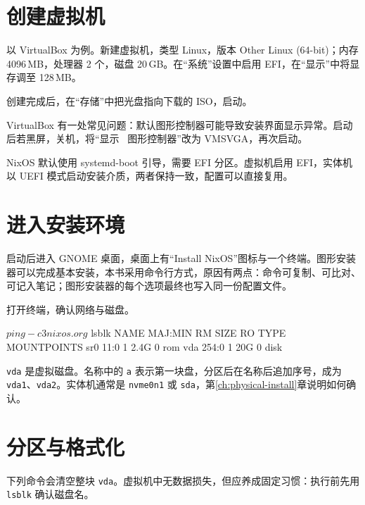 \section{创建虚拟机}

以 VirtualBox 为例。新建虚拟机，类型 Linux，版本 Other Linux (64-bit)；内存 4096\,MB，处理器 2 个，磁盘 20\,GB。在“系统”设置中启用 EFI，在“显示”中将显存调至 128\,MB。

创建完成后，在“存储”中把光盘指向下载的 ISO，启动。

VirtualBox 有一处常见问题：默认图形控制器可能导致安装界面显示异常。启动后若黑屏，关机，将“显示 \textrightarrow\ 图形控制器”改为 VMSVGA，再次启动。

\begin{notebox}
NixOS 默认使用 systemd-boot 引导，需要 EFI 分区。虚拟机启用 EFI，实体机以 UEFI 模式启动安装介质，两者保持一致，配置可以直接复用。
\end{notebox}

\section{进入安装环境}

启动后进入 GNOME 桌面，桌面上有“Install NixOS”图标与一个终端。图形安装器可以完成基本安装，本书采用命令行方式，原因有两点：命令可复制、可比对、可记入笔记；图形安装器的每个选项最终也写入同一份配置文件。

打开终端，确认网络与磁盘。

\begin{shellsession}
$ ping -c 3 nixos.org
$ lsblk
NAME   MAJ:MIN RM  SIZE RO TYPE MOUNTPOINTS
sr0     11:0    1  2.4G  0 rom
vda    254:0    1   20G  0 disk
\end{shellsession}

\texttt{vda} 是虚拟磁盘。名称中的 \texttt{a} 表示第一块盘，分区后在名称后追加序号，成为 \texttt{vda1}、\texttt{vda2}。实体机通常是 \texttt{nvme0n1} 或 \texttt{sda}，第\ref{ch:physical-install}章说明如何确认。

\section{分区与格式化}

下列命令会清空整块 \texttt{vda}。虚拟机中无数据损失，但应养成固定习惯：执行前先用 \texttt{lsblk} 确认磁盘名。


